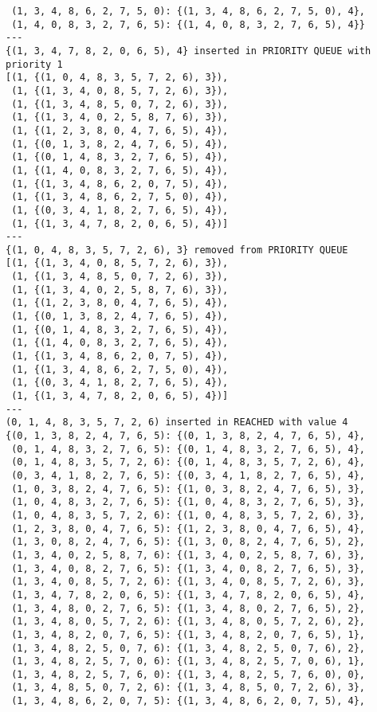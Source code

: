 \documentclass{article}
\begin{document}
\begin{verbatim}
 (1, 3, 4, 8, 6, 2, 7, 5, 0): {(1, 3, 4, 8, 6, 2, 7, 5, 0), 4},
 (1, 4, 0, 8, 3, 2, 7, 6, 5): {(1, 4, 0, 8, 3, 2, 7, 6, 5), 4}}
---
{(1, 3, 4, 7, 8, 2, 0, 6, 5), 4} inserted in PRIORITY QUEUE with priority 1
[(1, {(1, 0, 4, 8, 3, 5, 7, 2, 6), 3}),
 (1, {(1, 3, 4, 0, 8, 5, 7, 2, 6), 3}),
 (1, {(1, 3, 4, 8, 5, 0, 7, 2, 6), 3}),
 (1, {(1, 3, 4, 0, 2, 5, 8, 7, 6), 3}),
 (1, {(1, 2, 3, 8, 0, 4, 7, 6, 5), 4}),
 (1, {(0, 1, 3, 8, 2, 4, 7, 6, 5), 4}),
 (1, {(0, 1, 4, 8, 3, 2, 7, 6, 5), 4}),
 (1, {(1, 4, 0, 8, 3, 2, 7, 6, 5), 4}),
 (1, {(1, 3, 4, 8, 6, 2, 0, 7, 5), 4}),
 (1, {(1, 3, 4, 8, 6, 2, 7, 5, 0), 4}),
 (1, {(0, 3, 4, 1, 8, 2, 7, 6, 5), 4}),
 (1, {(1, 3, 4, 7, 8, 2, 0, 6, 5), 4})]
---
{(1, 0, 4, 8, 3, 5, 7, 2, 6), 3} removed from PRIORITY QUEUE
[(1, {(1, 3, 4, 0, 8, 5, 7, 2, 6), 3}),
 (1, {(1, 3, 4, 8, 5, 0, 7, 2, 6), 3}),
 (1, {(1, 3, 4, 0, 2, 5, 8, 7, 6), 3}),
 (1, {(1, 2, 3, 8, 0, 4, 7, 6, 5), 4}),
 (1, {(0, 1, 3, 8, 2, 4, 7, 6, 5), 4}),
 (1, {(0, 1, 4, 8, 3, 2, 7, 6, 5), 4}),
 (1, {(1, 4, 0, 8, 3, 2, 7, 6, 5), 4}),
 (1, {(1, 3, 4, 8, 6, 2, 0, 7, 5), 4}),
 (1, {(1, 3, 4, 8, 6, 2, 7, 5, 0), 4}),
 (1, {(0, 3, 4, 1, 8, 2, 7, 6, 5), 4}),
 (1, {(1, 3, 4, 7, 8, 2, 0, 6, 5), 4})]
---
(0, 1, 4, 8, 3, 5, 7, 2, 6) inserted in REACHED with value 4
{(0, 1, 3, 8, 2, 4, 7, 6, 5): {(0, 1, 3, 8, 2, 4, 7, 6, 5), 4},
 (0, 1, 4, 8, 3, 2, 7, 6, 5): {(0, 1, 4, 8, 3, 2, 7, 6, 5), 4},
 (0, 1, 4, 8, 3, 5, 7, 2, 6): {(0, 1, 4, 8, 3, 5, 7, 2, 6), 4},
 (0, 3, 4, 1, 8, 2, 7, 6, 5): {(0, 3, 4, 1, 8, 2, 7, 6, 5), 4},
 (1, 0, 3, 8, 2, 4, 7, 6, 5): {(1, 0, 3, 8, 2, 4, 7, 6, 5), 3},
 (1, 0, 4, 8, 3, 2, 7, 6, 5): {(1, 0, 4, 8, 3, 2, 7, 6, 5), 3},
 (1, 0, 4, 8, 3, 5, 7, 2, 6): {(1, 0, 4, 8, 3, 5, 7, 2, 6), 3},
 (1, 2, 3, 8, 0, 4, 7, 6, 5): {(1, 2, 3, 8, 0, 4, 7, 6, 5), 4},
 (1, 3, 0, 8, 2, 4, 7, 6, 5): {(1, 3, 0, 8, 2, 4, 7, 6, 5), 2},
 (1, 3, 4, 0, 2, 5, 8, 7, 6): {(1, 3, 4, 0, 2, 5, 8, 7, 6), 3},
 (1, 3, 4, 0, 8, 2, 7, 6, 5): {(1, 3, 4, 0, 8, 2, 7, 6, 5), 3},
 (1, 3, 4, 0, 8, 5, 7, 2, 6): {(1, 3, 4, 0, 8, 5, 7, 2, 6), 3},
 (1, 3, 4, 7, 8, 2, 0, 6, 5): {(1, 3, 4, 7, 8, 2, 0, 6, 5), 4},
 (1, 3, 4, 8, 0, 2, 7, 6, 5): {(1, 3, 4, 8, 0, 2, 7, 6, 5), 2},
 (1, 3, 4, 8, 0, 5, 7, 2, 6): {(1, 3, 4, 8, 0, 5, 7, 2, 6), 2},
 (1, 3, 4, 8, 2, 0, 7, 6, 5): {(1, 3, 4, 8, 2, 0, 7, 6, 5), 1},
 (1, 3, 4, 8, 2, 5, 0, 7, 6): {(1, 3, 4, 8, 2, 5, 0, 7, 6), 2},
 (1, 3, 4, 8, 2, 5, 7, 0, 6): {(1, 3, 4, 8, 2, 5, 7, 0, 6), 1},
 (1, 3, 4, 8, 2, 5, 7, 6, 0): {(1, 3, 4, 8, 2, 5, 7, 6, 0), 0},
 (1, 3, 4, 8, 5, 0, 7, 2, 6): {(1, 3, 4, 8, 5, 0, 7, 2, 6), 3},
 (1, 3, 4, 8, 6, 2, 0, 7, 5): {(1, 3, 4, 8, 6, 2, 0, 7, 5), 4},

\end{verbatim}
\end{document}
